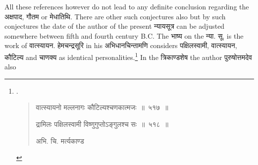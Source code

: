 \documentclass[11pt, openany]{book}
\begin{document}
\noindent
All these references however do not lead to any definite conclusion regarding the अक्षपाद, गौतम or मेधातिथि. There are other such conjectures also but by such conjectures the date of the author of the present न्यायसूत्र can be adjusted somewhere between fifth and fourth century B.C. The भाष्य on the न्या. सू. is the work of वात्स्यायन. हेमचन्द्रसूरि in his अभिधानचिन्तामणि considers पक्षिलस्वामी, वात्स्यायन, कौटिल्य and चाणक्य as identical personalities.\renewcommand{\thefootnote}{5}\footnote{.\begin{quote}
{\qt वात्स्यायनो मल्लनागः कौटिल्यश्चणकात्मजः~॥~५१७~॥

द्रामिलः पक्षिलस्वामी विष्णुगुप्तोऽङ्गुलश्च सः~॥~५१८~॥} अभि. चि. मर्त्यकाण्ड
\end{quote}} In the त्रिकाण्डशेष the author पुरुषोत्तमदेव also
\end{document}
